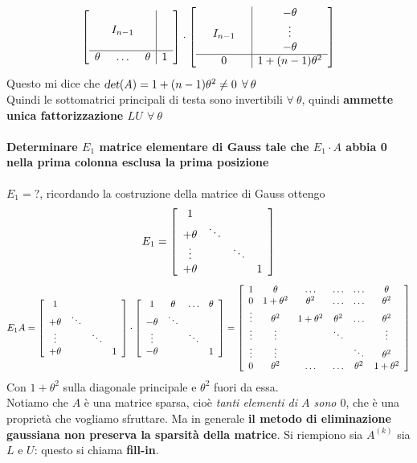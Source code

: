 \documentclass[10pt]{book}
\begin{document}
$$\left[ \begin{array}{c c c | c}
  & & & \\
  & I_{n-1} & & \\
  & & & \\
  \hline
  \theta &\ldots &\theta & 1
\end{array}\right] \cdot \left[ \begin{array}{c c c | c}
  & & & -\theta\\
  & I_{n-1} & &\vdots \\
  & & &-\theta \\
  \hline
  & 0 & & 1 + (n-1)\theta^2
\end{array}\right]$$
Questo mi dice che $\textsl{det}(A) = 1 + (n-1)\theta^2 \neq 0\:\:\forall\:\theta$\\
Quindi le sottomatrici principali di testa sono invertibili $\forall\:\theta$, quindi \textbf{ammette unica fattorizzazione $LU$ $\forall\:\theta$}
\paragraph{Determinare $E_1$ matrice elementare di Gauss tale che $E_1\cdot A$ abbia 0 nella prima colonna esclusa la prima posizione} $E_1 = ?$, ricordando la costruzione della matrice di Gauss ottengo
$$E_1 = \left[ \begin{array}{c c c c}
1\\
+\theta & \ddots\\
\vdots & & \ddots\\
+\theta & & & 1
\end{array} \right]$$
$$E_1 A = \left[ \begin{array}{c c c c}
1\\
+\theta & \ddots\\
\vdots & & \ddots\\
+\theta & & & 1
\end{array} \right]\cdot\left[ 
\begin{array}{c c c c}
1 & \theta & \ldots & \theta \\
-\theta & \ddots & &\\
\vdots & & \ddots &\\
-\theta & & & 1
\end{array}
\right] = \left[ 
\begin{array}{c c c c c c }
1 & \theta & \ldots & \ldots & \ldots & \theta \\
0 & 1 + \theta^2 & \theta^2 & \ldots & \ldots & \theta^2\\
\vdots & \theta^2 & 1 + \theta^2 & \theta^2 & \ldots & \theta^2\\
\vdots & \vdots & &\ddots & & \vdots\\
\vdots & \vdots & & & \ddots & \theta^2\\
0 & \theta^2 & \ldots & \ldots & \theta^2 & 1 + \theta^2
\end{array}
\right]$$
Con $1 + \theta^2$ sulla diagonale principale e $\theta^2$ fuori da essa.\\
Notiamo che $A$ è una matrice sparsa, cioè \textit{tanti elementi di $A$ sono $0$}, che è una proprietà che vogliamo sfruttare. Ma in generale \textbf{il metodo di eliminazione gaussiana non preserva la sparsità della matrice}. Si riempiono sia $A^{(k)}$ sia $L$ e $U$: questo si chiama \textbf{fill-in}.
\pagebreak
\end{document}
